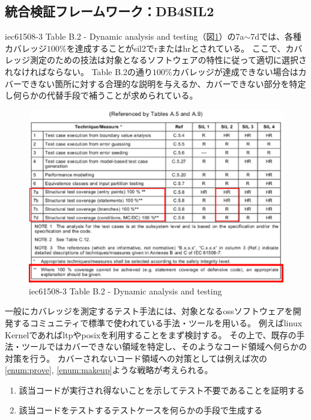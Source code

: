 \subsection{統合検証フレームワーク：DB4SIL2}
\label{db4sil2sec}
\acrshort{iec61508}-3 Table B.2 - Dynamic analysis and testing（図\ref{100}）の7a$\sim$7dでは、各種カバレッジ$100\%$を達成することが\gls{sil2}で\gls{r}または\gls{hr}とされている。
ここで、カバレッジ測定のための技法は対象となるソフトウェアの特性に従って適切に選択されなければならない。
Table B.2の通り$100\%$カバレッジが達成できない場合はカバーできない箇所に対する合理的な説明を与えるか、カバーできない部分を特定し何らかの代替手段で補うことが求められている。
\begin{figure}[ht]
  \centering
  \includegraphics[width=\textwidth]{pic/100.eps}
  \caption{\acrshort{iec61508}-3 Table B.2 - Dynamic analysis and testing}
  \label{100}
\end{figure}
\par
一般にカバレッジを測定するテスト手法には、対象となる\acrshort{oss}ソフトウェアを開発するコミュニティで標準で使われている手法・ツールを用いる。
例えば\acrshort{linux} Kernelであれば\acrshort{ltp}や\acrshort{posix}を利用することをまず検討する。
その上で、既存の手法・ツールではカバーできない領域を特定し、そのようなコード領域へ何らかの対策を行う。
カバーされないコード領域への対策としては例えば次の\ref{enum:prove}, \ref{enum:makeup}ような戦略が考えられる。
\begin{enumerate}
  \item 該当コードが実行され得ないことを示してテスト不要であることを証明する \label{enum:prove}
  \item 該当コードをテストするテストケースを何らかの手段で生成する \label{enum:makeup}
\end{enumerate}
